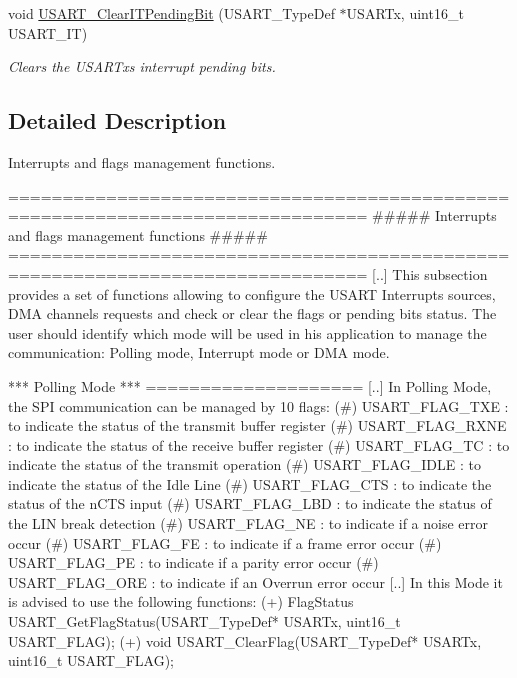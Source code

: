 \begin{DoxyCompactItemize}
void \mbox{\hyperlink{group___u_s_a_r_t___group9_ga1fc25d0338695063be5e50156955d9bc}{U\+S\+A\+R\+T\+\_\+\+Clear\+I\+T\+Pending\+Bit}} (U\+S\+A\+R\+T\+\_\+\+Type\+Def $\ast$U\+S\+A\+R\+Tx, uint16\+\_\+t U\+S\+A\+R\+T\+\_\+\+IT)
\begin{DoxyCompactList}\small\item\em Clears the U\+S\+A\+R\+Tx\textquotesingle{}s interrupt pending bits. \end{DoxyCompactList}\end{DoxyCompactItemize}


\subsection{Detailed Description}
Interrupts and flags management functions. 

\begin{DoxyVerb} ===============================================================================
            ##### Interrupts and flags management functions #####
 ===============================================================================  
    [..]
    This subsection provides a set of functions allowing to configure the USART 
    Interrupts sources, DMA channels requests and check or clear the flags or 
    pending bits status.
    The user should identify which mode will be used in his application to manage 
    the communication: Polling mode, Interrupt mode or DMA mode. 
    
    *** Polling Mode ***
    ====================
    [..]
    In Polling Mode, the SPI communication can be managed by 10 flags:
      (#) USART_FLAG_TXE : to indicate the status of the transmit buffer register
      (#) USART_FLAG_RXNE : to indicate the status of the receive buffer register
      (#) USART_FLAG_TC : to indicate the status of the transmit operation
      (#) USART_FLAG_IDLE : to indicate the status of the Idle Line             
      (#) USART_FLAG_CTS : to indicate the status of the nCTS input
      (#) USART_FLAG_LBD : to indicate the status of the LIN break detection
      (#) USART_FLAG_NE : to indicate if a noise error occur
      (#) USART_FLAG_FE : to indicate if a frame error occur
      (#) USART_FLAG_PE : to indicate if a parity error occur
      (#) USART_FLAG_ORE : to indicate if an Overrun error occur
    [..]
    In this Mode it is advised to use the following functions:
      (+) FlagStatus USART_GetFlagStatus(USART_TypeDef* USARTx, uint16_t USART_FLAG);
      (+) void USART_ClearFlag(USART_TypeDef* USARTx, uint16_t USART_FLAG);


\end{DoxyVerb}
